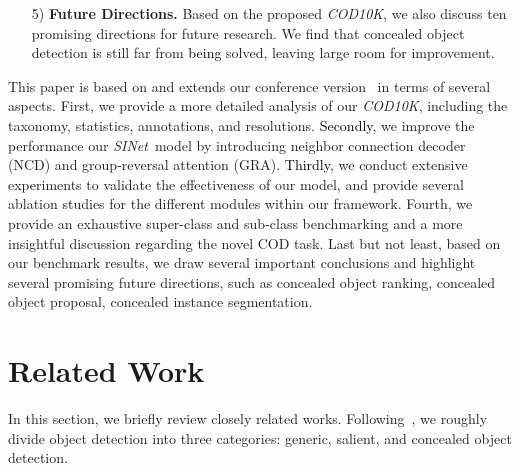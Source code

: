 \documentclass[10pt,journal,compsoc]{IEEEtran}
\newcommand{\figref}[1]{Fig.~\ref{#1}}
\newcommand{\Rev}[1]{\textcolor{black}{#1}}
\def\ourdataset{\textit{COD10K}}
\def\ournewmodel{\emph{SINet}}
\begin{document}
\begin{itemize}
\item [5)] \textbf{Future Directions.} 
Based on the proposed \ourdataset, 
we also discuss ten promising directions for future research. 
We find that concealed object detection is still far from \Rev{being} solved, 
leaving large room for improvement. 

\end{itemize}



This paper is based on and extends our conference version~\cite{fan2020camouflaged} in terms of several aspects. 
%
First, we provide a more detailed analysis of our \ourdataset, 
including the taxonomy, statistics, annotations, and resolutions. 
%
\Rev{Secondly}, we improve the performance our \ournewmodel~model by introducing 
neighbor connection decoder (NCD) and group-reversal attention (GRA). 
%
\Rev{Thirdly}, we conduct extensive experiments to validate the effectiveness of 
our model, and provide several ablation studies for the different modules 
within our framework.
%
Fourth, we provide an exhaustive super-class and sub-class benchmarking 
and a more insightful discussion regarding the novel COD task.
%
Last but not least, based on our benchmark results, 
we draw several important conclusions and 
highlight several promising future directions,  
such as concealed object ranking, concealed object proposal, 
concealed instance segmentation. 


\section{Related Work}\label{sec:RelatedWOrks}

In this section, we briefly review closely related works. 
Following~\cite{zhao2019object}, we roughly divide object detection into 
three categories: generic, salient, and concealed object detection. 
\end{document}
